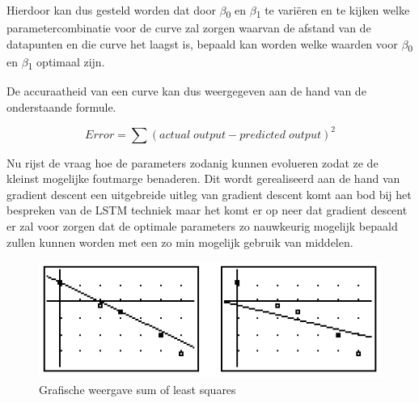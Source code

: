 Hierdoor kan dus gesteld worden dat door $\beta$\textsubscript{0} en $\beta$\textsubscript{1} te vari\"{e}ren en te kijken welke parametercombinatie voor de curve zal zorgen waarvan de afstand van de datapunten en die curve het laagst is, bepaald kan worden welke waarden voor  $\beta$\textsubscript{0} en $\beta$\textsubscript{1} optimaal zijn.

De accuraatheid van een curve kan dus weergegeven aan de hand van de onderstaande formule.

\begin{equation}
Error = \sum(actual\;output - predicted\;output)^2
\end{equation}

Nu rijst de vraag hoe de parameters zodanig kunnen evolueren zodat ze de kleinst mogelijke foutmarge benaderen. Dit wordt gerealiseerd aan de hand van gradient descent een uitgebreide uitleg van gradient descent komt aan bod bij het bespreken van de LSTM techniek maar het komt er op neer dat gradient descent er zal voor zorgen dat de optimale parameters zo nauwkeurig mogelijk bepaald zullen kunnen worden met een zo min mogelijk gebruik van middelen.



\begin{figure}[!h]
    \centering
    \caption{Grafische weergave sum of least squares~\autocite{Brown2020}}
    \label{fig:least_squares}
    \includegraphics[width=0.7\linewidth]{least_squares}
\end{figure}


